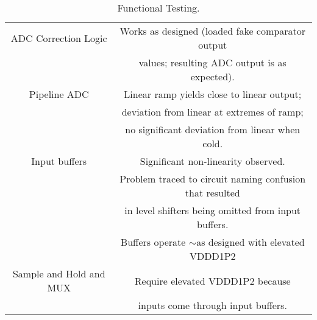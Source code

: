 \begin{table}[h]
\begin{tabular}{|c|c|}
 ADC Correction Logic & Works as designed (loaded fake comparator output \\ 
  & values; resulting ADC output is as expected). \\ \hline
Pipeline ADC & Linear ramp yields close to linear output; \\ 
 & deviation from linear at extremes of ramp; \\ 
  & no significant deviation from linear when cold. \\ \hline
Input buffers & Significant non-linearity observed. \\ 
 & Problem traced to circuit naming confusion that resulted \\ 
 & in level shifters being omitted from input buffers. \\
 & Buffers operate $\sim$as designed with elevated VDDD1P2 \\ \hline
 Sample and Hold and MUX & Require elevated VDDD1P2 because \\ 
 & inputs come through input buffers. \\ \hline
\end{tabular}
\caption{Functional Testing.}
\label{tab:Functionality}
\end{table}
